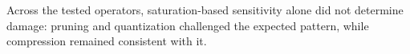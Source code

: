 Across the tested operators, saturation-based sensitivity alone did not
determine damage: pruning and quantization challenged the expected pattern,
while compression remained consistent with it.
